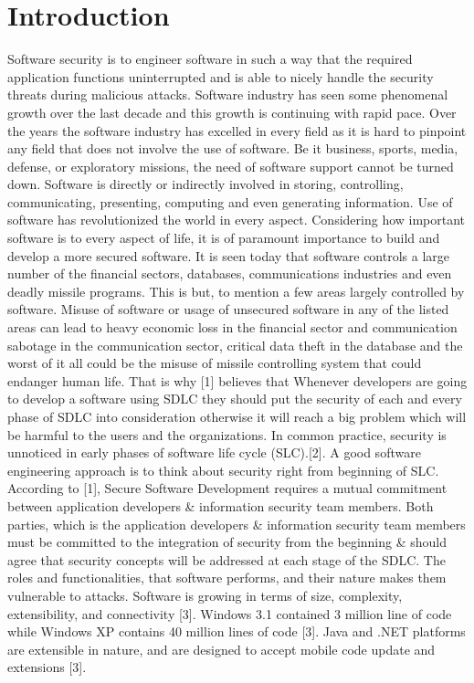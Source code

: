 \documentclass[12pt]{extreport}
\begin{document}
\section*{Introduction}
Software security is to engineer software in such a way that the required application functions uninterrupted and is able to nicely handle the security threats during malicious attacks. Software industry has seen some phenomenal growth over the last decade and this growth is continuing with rapid pace. Over the years the software industry has excelled in every field as it is hard to pinpoint any field that does not involve the use of software. Be it business, sports, media, defense, or exploratory missions, the need of software support cannot be turned down. Software is directly or indirectly involved in storing, controlling, communicating, presenting, computing and even generating information. Use of software has revolutionized the world in every aspect. Considering how important software is to every aspect of life, it is of paramount importance to build and develop a more secured software. 
It is seen today that software controls a large number of the financial sectors, databases, communications industries and even deadly missile programs. This is but, to mention a few areas largely controlled by software. Misuse of software or usage of unsecured software in any of the listed areas can lead to heavy economic loss in the financial sector and communication sabotage in the communication sector, critical data theft in the database and the worst of it all could be the misuse of missile controlling system that could endanger human life. That is why [1] believes that Whenever developers are going to develop a software using SDLC they should put the security of each and every phase of SDLC into consideration otherwise it will reach a big problem which will be harmful to the users and the organizations. In common practice, security is unnoticed in early phases of software life cycle (SLC).[2]. A good software engineering approach is to think about security right from beginning of SLC. According to [1], Secure Software Development requires a mutual commitment between application developers \& information security team members. Both parties, which is the application developers \& information security team members must be committed to the integration of security from the beginning \& should agree that security concepts will be addressed at each stage of the SDLC. The roles and functionalities, that software performs, and their nature makes them vulnerable to attacks. Software is growing in terms of size, complexity, extensibility, and connectivity [3]. Windows 3.1 contained 3 million line of code while Windows XP contains 40 million lines of code [3]. Java and .NET platforms are extensible in nature, and are designed to accept mobile code update and extensions [3].
\end{document}

